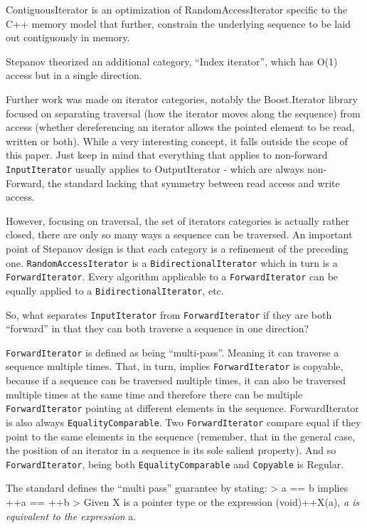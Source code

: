 \documentclass{wg21}
\begin{document}
ContiguousIterator is an optimization of RandomAccessIterator specific
to the C++ memory model that further, constrain the underlying sequence
to be laid out contiguously in memory.

Stepanov theorized an additional category, ``Index iterator'', which has
O(1) access but in a single direction.

Further work was made on iterator categories, notably the Boost.Iterator
library focused on separating traversal (how the iterator moves along
the sequence) from access (whether dereferencing an iterator allows the
pointed element to be read, written or both). While a very interesting
concept, it falls outside the scope of this paper. Just keep in mind
that everything that applies to non-forward \texttt{InputIterator}
usually applies to OutputIterator - which are always non-Forward, the
standard lacking that symmetry between read access and write access.

However, focusing on traversal, the set of iterators categories is
actually rather closed, there are only so many ways a sequence can be
traversed. An important point of Stepanov design is that each category
is a refinement of the preceding one. \texttt{RandomAccessIterator} is a
\texttt{BidirectionalIterator} which in turn is a
\texttt{ForwardIterator}. Every algorithm applicable to a
\texttt{ForwardIterator} can be equally applied to a
\texttt{BidirectionalIterator}, etc.

So, what separates \texttt{InputIterator} from \texttt{ForwardIterator}
if they are both ``forward'' in that they can both traverse a sequence
in one direction?

\texttt{ForwardIterator} is defined as being ``multi-pass''. Meaning it
can traverse a sequence multiple times. That, in turn, implies
\texttt{ForwardIterator} is copyable, because if a sequence can be
traversed multiple times, it can also be traversed multiple times at the
same time and therefore there can be multiple \texttt{ForwardIterator}
pointing at different elements in the sequence. ForwardIterator is also
always \texttt{EqualityComparable}. Two \texttt{ForwardIterator} compare
equal if they point to the same elements in the sequence (remember, that
in the general case, the position of an iterator in a sequence is its
sole salient property). And so \texttt{ForwardIterator}, being both
\texttt{EqualityComparable} and \texttt{Copyable} is Regular.

The standard defines the ``multi pass'' guarantee by stating:
\textgreater{} a == b implies ++a == ++b \textgreater{} Given X is a
pointer type or the expression (void)++X(a), \emph{a is equivalent to
	the expression }a.
\end{document}
